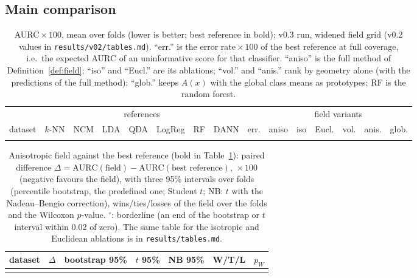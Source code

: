 \documentclass[10pt,a4paper]{article}
\theoremstyle{plain}
\theoremstyle{definition}
\theoremstyle{remark}
\newcommand{\aurc}{\mathrm{AURC}}
\begin{document}
\subsection{Main comparison}

\begin{table}[t]
\centering\footnotesize
\setlength{\tabcolsep}{2.3pt}
\begin{tabular}{lrrrrrrrrrrrrrr}
\toprule
& \multicolumn{7}{c}{references} & & \multicolumn{6}{c}{field variants}\\
\cmidrule(lr){2-8}\cmidrule(lr){10-15}
dataset & $k$-NN & NCM & LDA & QDA & LogReg & RF & DANN & err. & aniso & iso & Eucl. & vol. & anis. & glob.\\
\midrule
\\
\bottomrule
\end{tabular}
\caption{AURC${}\times100$, mean over \MetaFolds{} folds (lower is better; best reference in bold); v0.3 run, widened field grid (v0.2 values in \texttt{results/v02/tables.md}). ``err.'' is the error rate${}\times100$ of the best reference at full coverage, i.e.\ the expected AURC of an uninformative score for that classifier. ``aniso'' is the full method of Definition~\ref{def:field}; ``iso'' and ``Eucl.'' are its ablations; ``vol.'' and ``anis.'' rank by geometry alone (with the predictions of the full method); ``glob.'' keeps $A(x)$ with the global class means as prototypes; RF is the random forest.}
\label{tab:aurc}
\end{table}

\begin{table}[t]
\centering\footnotesize
\setlength{\tabcolsep}{3pt}
\begin{tabular}{lrcccrr}
\toprule
dataset & $\Delta$ & bootstrap 95\% & $t$ 95\% & NB 95\% & W/T/L & $p_W$\\
\midrule
\\
\bottomrule
\end{tabular}
\caption{Anisotropic field against the best reference (bold in Table~\ref{tab:aurc}): paired difference $\Delta=\aurc(\text{field})-\aurc(\text{best reference})$, ${}\times100$ (negative favours the field), with three 95\% intervals over folds (percentile bootstrap, the predefined one; Student $t$; NB: $t$ with the Nadeau--Bengio correction), wins/ties/losses of the field over the \MetaFolds{} folds and the Wilcoxon $p$-value. $^{\circ}$: borderline (an end of the bootstrap or $t$ interval within $0.02$ of zero). The same table for the isotropic and Euclidean ablations is in \texttt{results/tables.md}.}
\label{tab:diff}
\end{table}
\end{document}
